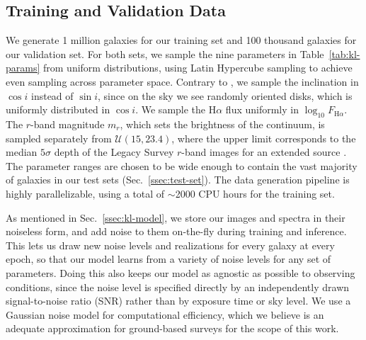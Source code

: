 \subsection{Training and Validation Data}
\label{ssec:datasets}

We generate 1 million galaxies for our training set and 100 thousand galaxies for our validation set. For both sets, we sample the nine parameters in Table~\ref{tab:kl-params} from uniform distributions, using Latin Hypercube sampling to achieve even sampling across parameter space. Contrary to \citep{KLDESI}, we sample the inclination in $\cos i$ instead of $\sin i$, since on the sky we see randomly oriented disks, which is uniformly distributed in $\cos i$. We sample the H$\alpha$ flux uniformly in $\log_{10}F_{\mathrm{H}\alpha}$. The $r$-band magnitude $m_r$, which sets the brightness of the continuum, is sampled separately from $\mathcal{U}(15, 23.4)$, where the upper limit corresponds to the median $5\sigma$ depth of the Legacy Survey $r$-band images for an extended source \citep{KLDESI}. The parameter ranges are chosen to be wide enough to contain the vast majority of galaxies in our test sets (Sec.~\ref{ssec:test-set}). The data generation pipeline is highly parallelizable, using a total of $\sim$2000 CPU hours for the training set.

As mentioned in Sec.~\ref{ssec:kl-model}, we store our images and spectra in their noiseless form, and add noise to them on-the-fly during training and inference. This lets us draw new noise levels and realizations for every galaxy at every epoch, so that our model learns from a variety of noise levels for any set of parameters. Doing this also keeps our model as agnostic  as possible to observing conditions, since the noise level is specified directly by an independently drawn signal-to-noise ratio (SNR) rather than by exposure time or sky level. We use a Gaussian noise model for computational efficiency, which we believe is an adequate approximation for ground-based surveys for the scope of this work.

